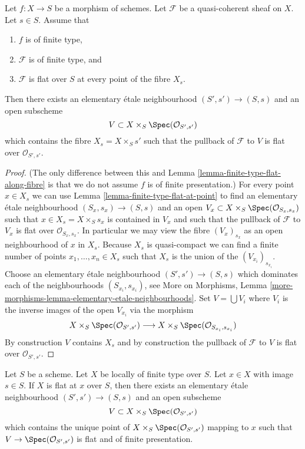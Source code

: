 \begin{lemma}
\label{lemma-finite-type-flat-along-fibre-variant}
Let $f : X \to S$ be a morphism of schemes.
Let $\mathcal{F}$ be a quasi-coherent sheaf on $X$.
Let $s \in S$.
Assume that
\begin{enumerate}
\item $f$ is of finite type,
\item $\mathcal{F}$ is of finite type, and
\item $\mathcal{F}$ is flat over $S$ at every point of the fibre $X_s$.
\end{enumerate}
Then there exists an elementary \'etale neighbourhood $(S', s') \to (S, s)$
and an open subscheme
$$
V \subset X \times_S \Spec(\mathcal{O}_{S', s'})
$$
which contains the fibre $X_s = X \times_S s'$ such that the pullback
of $\mathcal{F}$ to $V$ is flat over $\mathcal{O}_{S', s'}$.
\end{lemma}

\begin{proof}
(The only difference between this and
Lemma \ref{lemma-finite-type-flat-along-fibre}
is that we do not assume $f$ is of finite presentation.)
For every point $x \in X_s$ we can use
Lemma \ref{lemma-finite-type-flat-at-point}
to find an elementary \'etale neighbourhood $(S_x, s_x) \to (S, s)$
and an open $V_x \subset X \times_S \Spec(\mathcal{O}_{S_x, s_x})$
such that $x \in X_s = X \times_S s_x$ is contained in $V_x$ and such that
the pullback of $\mathcal{F}$ to $V_x$ is flat over
$\mathcal{O}_{S_x, s_x}$. In particular we may view the fibre
$(V_x)_{s_x}$ as an open neighbourhood of $x$ in $X_s$.
Because $X_s$ is quasi-compact we can find a finite number of points
$x_1, \ldots, x_n \in X_s$ such that $X_s$ is the union of
the $(V_{x_i})_{s_{x_i}}$. Choose an elementary \'etale neighbourhood
$(S' , s') \to (S, s)$ which dominates each of the neighbourhoods
$(S_{x_i}, s_{x_i})$, see
More on Morphisms,
Lemma \ref{more-morphisms-lemma-elementary-etale-neighbourhoods}.
Set $V = \bigcup V_i$ where $V_i$ is the inverse images of the open
$V_{x_i}$ via the morphism
$$
X \times_S \Spec(\mathcal{O}_{S', s'})
\longrightarrow
X \times_S \Spec(\mathcal{O}_{S_{x_i}, s_{x_i}})
$$
By construction $V$ contains $X_s$ and by construction the pullback
of $\mathcal{F}$ to $V$ is flat over $\mathcal{O}_{S', s'}$.
\end{proof}

\begin{lemma}
\label{lemma-finite-type-flat-at-point-X}
Let $S$ be a scheme. Let $X$ be locally of finite type over $S$.
Let $x \in X$ with image $s \in S$.
If $X$ is flat at $x$ over $S$, then there exists an elementary
\'etale neighbourhood $(S', s') \to (S, s)$ and an open subscheme
$$
V \subset X \times_S \Spec(\mathcal{O}_{S', s'})
$$
which contains the unique point of
$X \times_S \Spec(\mathcal{O}_{S', s'})$ mapping to $x$
such that $V \to \Spec(\mathcal{O}_{S', s'})$
is flat and of finite presentation.
\end{lemma}

